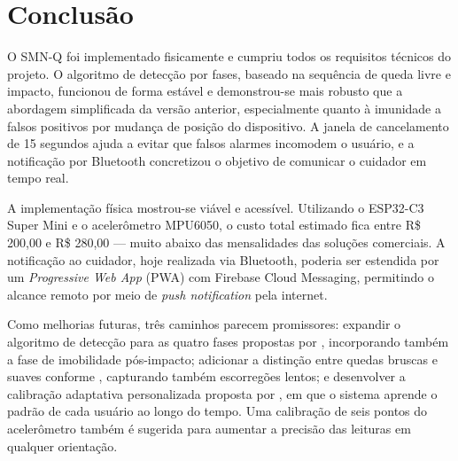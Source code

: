 \section{\esp Conclusão}

O SMN-Q foi implementado fisicamente e cumpriu todos os requisitos técnicos do projeto. O algoritmo de detecção por fases, baseado na sequência de queda livre e impacto, funcionou de forma estável e demonstrou-se mais robusto que a abordagem simplificada da versão anterior, especialmente quanto à imunidade a falsos positivos por mudança de posição do dispositivo. A janela de cancelamento de 15 segundos ajuda a evitar que falsos alarmes incomodem o usuário, e a notificação por Bluetooth concretizou o objetivo de comunicar o cuidador em tempo real.

A implementação física mostrou-se viável e acessível. Utilizando o ESP32-C3 Super Mini e o acelerômetro MPU6050, o custo total estimado fica entre R\$ 200,00 e R\$ 280,00 --- muito abaixo das mensalidades das soluções comerciais. A notificação ao cuidador, hoje realizada via Bluetooth, poderia ser estendida por um \textit{Progressive Web App} (PWA) com Firebase Cloud Messaging, permitindo o alcance remoto por meio de \textit{push notification} pela internet.

Como melhorias futuras, três caminhos parecem promissores: expandir o algoritmo de detecção para as quatro fases propostas por , incorporando também a fase de imobilidade pós-impacto; adicionar a distinção entre quedas bruscas e suaves conforme , capturando também escorregões lentos; e desenvolver a calibração adaptativa personalizada proposta por , em que o sistema aprende o padrão de cada usuário ao longo do tempo. Uma calibração de seis pontos do acelerômetro também é sugerida para aumentar a precisão das leituras em qualquer orientação.
